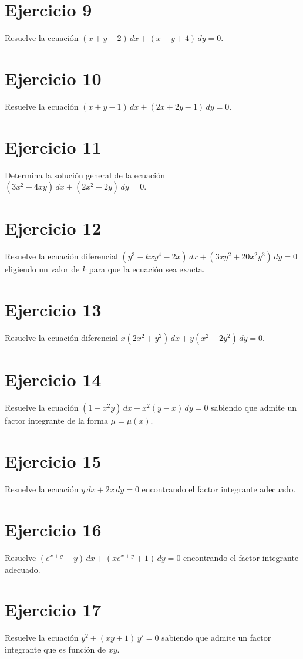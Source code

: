 \documentclass[12pt]{article}
\begin{document}
\section*{Ejercicio 9}
Resuelve la ecuación $(x + y - 2)\,dx + (x - y + 4)\,dy = 0$.

\section*{Ejercicio 10}
Resuelve la ecuación $(x + y - 1)\,dx + (2x + 2y - 1)\,dy = 0$.

\section*{Ejercicio 11}
Determina la solución general de la ecuación $(3x^2 + 4xy)\,dx + (2x^2 + 2y)\,dy = 0$.

\section*{Ejercicio 12}
Resuelve la ecuación diferencial $(y^3 - kxy^4 - 2x)\,dx + (3xy^2 + 20x^2y^3)\,dy = 0$ eligiendo un valor de $k$ para que la ecuación sea exacta.

\section*{Ejercicio 13}
Resuelve la ecuación diferencial $x(2x^2 + y^2)\,dx + y(x^2 + 2y^2)\,dy = 0$.

\section*{Ejercicio 14}
Resuelve la ecuación $(1 - x^2y)\,dx + x^2(y - x)\,dy = 0$ sabiendo que admite un factor integrante de la forma $\mu = \mu(x)$.

\section*{Ejercicio 15}
Resuelve la ecuación $y\,dx + 2x\,dy = 0$ encontrando el factor integrante adecuado.

\section*{Ejercicio 16}
Resuelve $(e^{x+y} - y)\,dx + (x e^{x+y} + 1)\,dy = 0$ encontrando el factor integrante adecuado.

\section*{Ejercicio 17}
Resuelve la ecuación $y^2 + (xy + 1)\,y' = 0$ sabiendo que admite un factor integrante que es función de $xy$.
\end{document}
